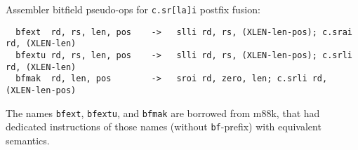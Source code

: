 Assembler bitfield pseudo-ops for {\tt c.sr[la]i} postfix fusion:

\begin{minipage}{\linewidth}
\begin{verbatim}
  bfext  rd, rs, len, pos    ->   slli rd, rs, (XLEN-len-pos); c.srai rd, (XLEN-len)
  bfextu rd, rs, len, pos    ->   slli rd, rs, (XLEN-len-pos); c.srli rd, (XLEN-len)
  bfmak  rd, len, pos        ->   sroi rd, zero, len; c.srli rd, (XLEN-len-pos)
\end{verbatim}
\end{minipage}

The names {\tt bfext}, {\tt bfextu}, and {\tt bfmak} are borrowed from m88k, that had
dedicated instructions of those names (without {\tt bf}-prefix) with equivalent semantics.~\cite[p.~3-28]{m88k}
